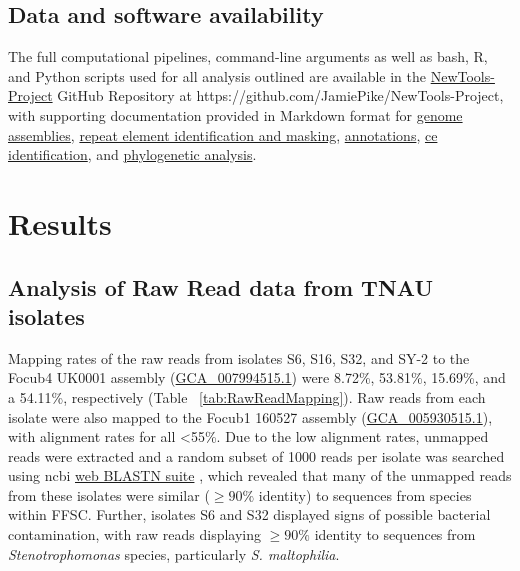\subsection{Data and software availability}
\label{sec:chap2dataavail}

The full computational pipelines, command-line arguments as well as bash, R, and Python scripts used for all analysis outlined are available in the \href{https://github.com/JamiePike/NewTools-Project}{NewTools-Project} GitHub Repository at https://github.com/JamiePike/NewTools-Project, with supporting documentation provided in Markdown format for \href{https://github.com/JamiePike/NewTools-Project/blob/master/docs/Assembly/AssemblyNotes.md}{genome assemblies}, \href{https://github.com/JamiePike/NewTools-Project/blob/master/docs/Annotations/RepeatMaskingNotes.md}{repeat element identification and masking}, \href{https://github.com/JamiePike/NewTools-Project/blob/master/docs/Annotations/Annotations.md}{annotations}, \href{https://github.com/JamiePike/NewTools-Project/blob/master/docs/Effectors/PredicitionofCandidateEffectors.md}{\ac{ce} identification}, and \href{https://github.com/JamiePike/NewTools-Project/blob/master/docs/Phylogeny/Phylogenies.md}{phylogenetic analysis}.

\newpage
\section{Results}

\subsection{Analysis of Raw Read data from TNAU isolates}
\label{sec:chap2RawReadMapping}

Mapping rates of the raw reads from isolates S6, S16, S32, and SY-2 to the \ac{Focub4} UK0001 assembly (\href{https://www.ncbi.nlm.nih.gov/datasets/genome/GCA_007994515.1/}{GCA\_007994515.1}) were 8.72\%, 53.81\%, 15.69\%, and a 54.11\%, respectively (Table ~\ref{tab:RawReadMapping}). Raw reads from each isolate were also mapped to the \ac{Focub1} 160527 assembly (\href{https://www.ncbi.nlm.nih.gov/datasets/genome/GCA_005930515.1/}{GCA\_005930515.1}), with alignment rates for all \textless 55\%. Due to the low alignment rates, unmapped reads were extracted and a random subset of 1000 reads per isolate was searched using \ac{ncbi} \href{https://blast.ncbi.nlm.nih.gov/Blast.cgi?PROGRAM=blastn&BLAST_SPEC=GeoBlast&PAGE_TYPE=BlastSearch}{web BLASTN suite} \parencite{Nih2014}, which revealed that many of the unmapped reads from these isolates were similar ($\geq90\% $ identity) to sequences from species within \ac{FFSC}. Further, isolates S6 and S32 displayed signs of possible bacterial contamination, with raw reads displaying $ \geq90\% $ identity to sequences from \textit{Stenotrophomonas} species, particularly \textit{S. maltophilia}. 

